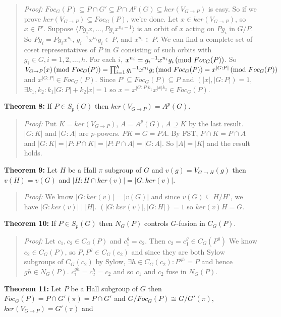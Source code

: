 \begin{quote}
\emph{Proof:}  
$Foc_G(P) \subseteq  P \cap G' \subseteq  P \cap A^p(G)  \subseteq ker(V_{G \rightarrow P})$ is
easy.  So if we prove
$ker(V_{G \rightarrow P}) \subseteq Foc_G(P)$, we're done.  Let $x \in ker(V_{G \rightarrow P})$, so $x \in P'$.
Suppose $\langle Pg_i x, \ldots , P g_i x^{n_i - 1} \rangle$ is an orbit of $x$ acting on $Pg_i$ in $G/P$. So $Pg_i = Pg_i x^{n_i}$,
${g_i}^{-1} x^{n_i} g_i \in P$, and $x^{n_i} \in P$.  
We can find a complete set of coset representatives of $P$ in $G$ consisting of such orbits with $g_i \in G, i = 1,2, \ldots, h$.
For each $i$, $x^{n_i} = {g_i}^{-1} x^{n_i} g_i \thinspace \textnormal{(mod } Foc_G(P) \textnormal{)}$.  So 
$V_{G \rightarrow P}(x) \thinspace \textnormal{(mod } Foc_G(P) \textnormal{)} = \prod_{i=1}^h {g_i}^{-1} x^{n_i} g_i \thinspace \textnormal{(mod } Foc_G(P) \textnormal{)} = x^{|G:P|} \thinspace \textnormal{(mod } Foc_G(P) \textnormal{)}$
and  $x^{|G:P|} \in Foc_G(P)$.  Since $P' \subseteq Foc_G(P) \subseteq P$ and $(|x|, |G:P|) =1$, $\exists k_1, k_2: k_1|G:P| + k_2|x| = 1$
so $x = x^{|G:P| k_1} x^{|x| k_2} \in Foc_G(P)$.
\end{quote}
{\bf Theorem 8:}  
If $P \in S_p(G)$ then $ker(V_{G \rightarrow P})= A^p(G)$.
\begin{quote}
\emph{Proof:}  
Put $K= ker(V_{G \rightarrow P})$, $A= A^p(G)$,  $A \supseteq K$ by the last result.
$|G:K|$ and $|G:A|$ are $p$-powers.  $PK=G=PA$.  By FST, $P \cap K = P \cap A$ and
$|G:K|= |P:P \cap K|= |P: P \cap A|= |G:A|$.  So $|A|= |K|$ and the result holds.
\end{quote}
{\bf Theorem 9:}  
Let $H$ be a Hall $\pi$ subgroup of $G$ and $v(g)= V_{G \rightarrow H}(g)$ then
$v(H)=v(G)$ and $|H: H \cap ker(v)|= |G:ker(v)|$.
\begin{quote}
\emph{Proof:}  
We know $|G:ker(v)| = |v(G)|$ and since
$v(G) \subseteq H/H'$, we have $|G:ker(v)| \mid |H|$.  $(|G:ker(v)|, |G:H|)=1$ so
$ker(v)H=G$.
\end{quote}
{\bf Theorem 10:}  
If $P \in S_p(G)$ then $N_G(P)$ controls $G$-fusion in $C_G(P)$.
\begin{quote}
\emph{Proof:}  
Let $c_1 , c_2 \in C_G(P)$ and $c_1^g=c_2$.  Then $c_2 = c_1^g \in C_G(P^g)$
We know $c_2 \in C_G(P)$, so $P, P^g \in C_G(c_2)$ and since they are both
Sylow subgroups of $C_G(c_2)$ by Sylow, $\exists h \in C_G(c_2): P^{gh}=P$ and
hence $gh \in N_G(P)$.  $c_1^{gh}= c_2^h= c_2$ and so $c_1$ and $c_2$ fuse in $N_G(P)$.
\end{quote}
{\bf Theorem 11:}  Let  $P$ be a Hall subgroup of $G$ then $Foc_G(P) = P \cap G'(\pi)=P \cap G'$ and
$G/Foc_G(P) \cong G/G'(\pi)$, $ker(V_{G \rightarrow P}) = G'(\pi)$ and
